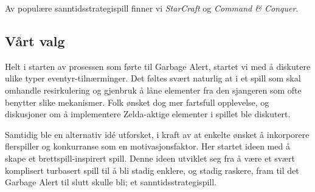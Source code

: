 	Av populære sanntidsstrategispill finner vi \emph{StarCraft} og \emph{Command \& Conquer}.


\subsection{Vårt valg}
Helt i starten av prosessen som førte til Garbage Alert, startet vi med å diskutere ulike typer eventyr-tilnærminger. Det føltes svært naturlig at i et spill som skal omhandle resirkulering og gjenbruk å låne elementer fra den sjangeren som ofte benytter slike mekanismer. Folk ønsket dog mer fartsfull opplevelse, og diskusjoner om å implementere Zelda-aktige elementer i spillet ble diskutert.

Samtidig ble en alternativ idé utforsket, i kraft av at enkelte ønsket å inkorporere flerspiller og konkurranse som en motivasjonsfaktor. Her startet ideen med å skape et brettspill-inspirert spill. Denne ideen utviklet seg fra å være et svært komplisert turbasert spill til å bli stadig enklere, og stadig raskere, fram til det Garbage Alert til slutt skulle bli; et sanntidsstrategispill.

